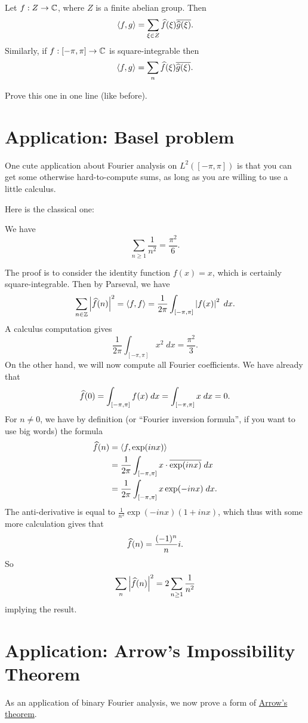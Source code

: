 \begin{corollary}
	Let $f : Z \to \mathbb C$, where $Z$ is a finite abelian group.
	Then \[ \left< f,g \right> = \sum_{\xi \in Z} \widehat f(\xi) \overline{\widehat g(\xi)}. \]
	Similarly, if $f : [-\pi, \pi] \to \mathbb C$ is square-integrable then
	\[ \left< f,g \right> = \sum_n \widehat f(\xi) \overline{\widehat g(\xi)}. \]
\end{corollary}
\begin{ques}
	Prove this one in one line (like before).
\end{ques}

\section{Application: Basel problem}
One cute application about Fourier analysis on $L^2([-\pi, \pi])$
is that you can get some otherwise hard-to-compute sums,
as long as you are willing to use a little calculus.

Here is the classical one:
\begin{theorem}
	We have
	\[ \sum_{n \ge 1} \frac{1}{n^2} = \frac{\pi^2}{6}. \]
\end{theorem}
The proof is to consider the identity function $f(x) = x$,
which is certainly square-integrable.
Then by Parseval, we have
\[
	\sum_{n \in \mathbb Z} \left\lvert \widehat f(n) \right\rvert^2
	= \left< f,f\right>
	= \frac{1}{2\pi} \int_{[-\pi, \pi]} \left\lvert f(x) \right\rvert^2 \; dx.
\]
A calculus computation gives
\[  \frac{1}{2\pi} \int_{[-\pi, \pi]} x^2 \; dx = \frac{\pi^2}{3}. \]
On the other hand, we will now compute all Fourier coefficients.
We have already that
\[ \widehat f(0) = \int_{[-\pi, \pi]} f(x) \; dx 
	= \int_{[-\pi, \pi]} x \; dx = 0. \]
For $n \neq 0$, we have by definition
(or ``Fourier inversion formula'', if you want to use big words)
the formula
\begin{align*}
	\widehat f(n) &= \left< f, \exp(inx) \right> \\
	&= \frac{1}{2\pi} \int_{[-\pi, \pi]} x \cdot \overline{\exp(inx)} \; dx \\
	&= \frac{1}{2\pi} \int_{[-\pi, \pi]} x \exp(-inx) \; dx.
\end{align*}
The anti-derivative is equal to
$\frac{1}{n^2} \exp(-inx) (1+inx)$,
which thus with some more calculation gives that
\[ \widehat f(n) = \frac{(-1)^n}{n} i. \]
So
\[ \sum_n \left\lvert \widehat f(n) \right\rvert^2
	= 2 \sum_{n \ge 1} \frac{1}{n^2} \]
implying the result.

\section{Application: Arrow's Impossibility Theorem}
As an application of binary Fourier analysis,
we now prove a form of
\href{https://en.wikipedia.org/wiki/Arrow's_impossibility_theorem}{Arrow's theorem}.

